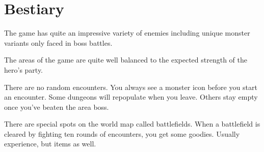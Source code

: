 \chapter{Bestiary}

The game has quite an impressive variety of enemies including unique monster variants only faced in boss battles.

The areas of the game are quite well balanced to the expected strength of the hero’s party.

There are no random encounters. You always see a monster icon before you start an encounter. Some dungeons will repopulate when you leave. Others stay empty once you’ve beaten the area boss.

There are special spots on the world map called battlefields. When a battlefield is cleared by fighting ten rounds of encounters, you get some goodies. Usually experience, but items as well.

